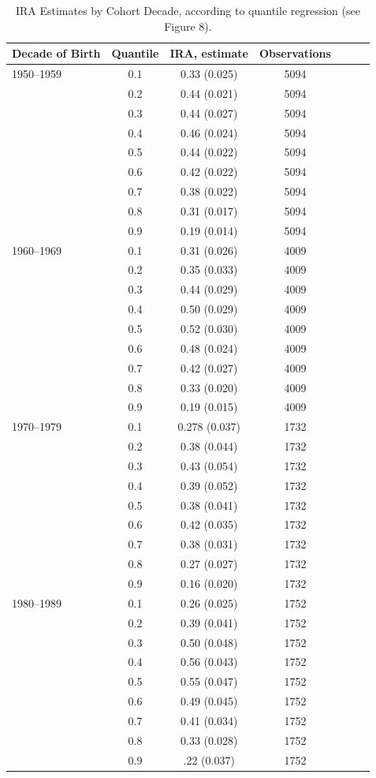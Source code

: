 \documentclass[notitlepage,12pt]{article}
\begin{document}
\begin{longtable}{lc|ccccc}
\caption{IRA Estimates by Cohort Decade, according to quantile regression (see Figure 8).} \\ \midrule
Decade of Birth & Quantile & IRA, estimate      &  Observations  \\ \midrule
1950--1959 & 0.1 & 0.33  (0.025) & 5094 &  \\
& 0.2 & 0.44  (0.021) & 5094 &  \\
& 0.3 & 0.44  (0.027) & 5094 &  \\
& 0.4 & 0.46  (0.024) & 5094 &  \\
& 0.5 & 0.44  (0.022) & 5094 &  \\
& 0.6 & 0.42  (0.022) & 5094 &  \\
& 0.7 & 0.38  (0.022) & 5094 &  \\
& 0.8 & 0.31  (0.017) & 5094 &  \\
& 0.9 & 0.19  (0.014) & 5094 & \\ \hline
1960--1969 & 0.1 & 0.31  (0.026) & 4009 &  \\
& 0.2 & 0.35        (0.033) & 4009 &  \\
& 0.3 & 0.44  (0.029) & 4009 &  \\
& 0.4 & 0.50         (0.029) & 4009 &  \\
& 0.5 & 0.52        (0.030) & 4009 &  \\
& 0.6 & 0.48  (0.024) & 4009 &  \\
& 0.7 & 0.42  (0.027) & 4009 &  \\
& 0.8 & 0.33       (0.020) & 4009 &  \\
& 0.9 & 0.19      (0.015) & 4009 & \\ \hline
1970--1979 & 0.1 & 0.278  (0.037) & 1732 &  \\
& 0.2 & 0.38       (0.044) & 1732 &  \\
& 0.3 & 0.43  (0.054) & 1732 &  \\
& 0.4 & 0.39  (0.052) & 1732 &  \\
& 0.5 & 0.38  (0.041) & 1732 &  \\
& 0.6 & 0.42  (0.035) & 1732 &  \\
& 0.7 & 0.38  (0.031) & 1732 &  \\
& 0.8 & 0.27  (0.027) & 1732 &  \\
& 0.9 & 0.16  (0.020) & 1732 & \\ \hline
1980--1989 & 0.1 & 0.26  (0.025) & 1752 &  \\
& 0.2 & 0.39  (0.041) & 1752 &  \\
& 0.3 & 0.50         (0.048) & 1752 &  \\
& 0.4 & 0.56  (0.043) & 1752 &  \\
& 0.5 & 0.55  (0.047) & 1752 &  \\
& 0.6 & 0.49  (0.045) & 1752 &  \\
& 0.7 & 0.41  (0.034) & 1752 &  \\
& 0.8 & 0.33  (0.028) & 1752 &  \\
& 0.9 & .22  (0.037) & 1752 & \\
\midrule \bottomrule
\end{longtable}
\end{document}

